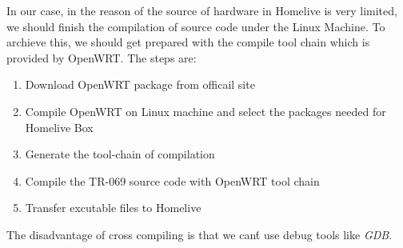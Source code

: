 In our case, in the reason of the source of hardware in Homelive is very limited, we should finish the compilation of source code under the Linux Machine. To archieve this, we should get prepared with the compile tool chain which is provided by OpenWRT. The steps are:

\begin{enumerate}
  \item Download OpenWRT package from officail site
  \item Compile OpenWRT on Linux machine and select the packages needed for Homelive Box
  \item Generate the tool-chain of compilation
  \item Compile the TR-069 source code with OpenWRT tool chain
  \item Transfer excutable files to Homelive
\end{enumerate}

The disadvantage of cross compiling is that we can\'t use debug tools like \textit{GDB}.
